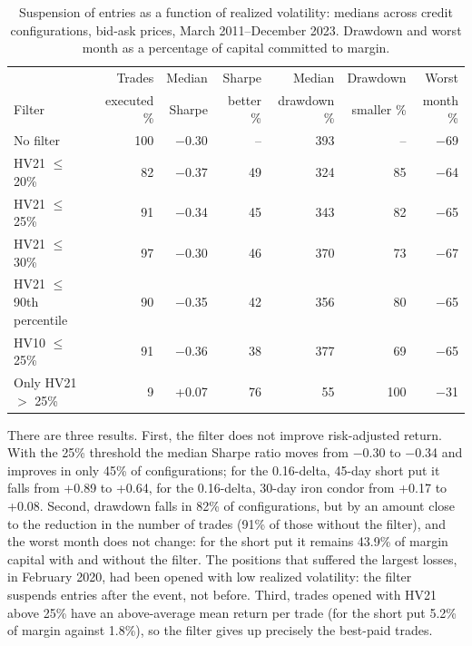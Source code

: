 \documentclass[11pt,a4paper]{article}
\begin{document}
\begin{table}[ht]\centering\small
\caption{Suspension of entries as a function of realized volatility: medians across credit configurations, bid-ask prices, March 2011--December 2023. Drawdown and worst month as a percentage of capital committed to margin.}\label{tab:fvol}
\begin{tabular}{lrrrrrr}\toprule
 & Trades & Median & Sharpe & Median & Drawdown & Worst \\
Filter & executed \% & Sharpe & better \% & drawdown \% & smaller \% & month \% \\ \midrule
No filter & 100 & $-$0.30 & -- & 393 & -- & $-$69 \\
HV21 $\le$ 20\% & 82 & $-$0.37 & 49 & 324 & 85 & $-$64 \\
HV21 $\le$ 25\% & 91 & $-$0.34 & 45 & 343 & 82 & $-$65 \\
HV21 $\le$ 30\% & 97 & $-$0.30 & 46 & 370 & 73 & $-$67 \\
HV21 $\le$ 90th percentile & 90 & $-$0.35 & 42 & 356 & 80 & $-$65 \\
HV10 $\le$ 25\% & 91 & $-$0.36 & 38 & 377 & 69 & $-$65 \\
Only HV21 $>$ 25\% & 9 & +0.07 & 76 & 55 & 100 & $-$31 \\
\bottomrule\end{tabular}\end{table}

There are three results. First, the filter does not improve risk-adjusted return. With the 25\% threshold the median Sharpe ratio moves from $-$0.30 to $-$0.34 and improves in only 45\% of configurations; for the 0.16-delta, 45-day short put it falls from +0.89 to +0.64, for the 0.16-delta, 30-day iron condor from +0.17 to +0.08. Second, drawdown falls in 82\% of configurations, but by an amount close to the reduction in the number of trades (91\% of those without the filter), and the worst month does not change: for the short put it remains 43.9\% of margin capital with and without the filter. The positions that suffered the largest losses, in February 2020, had been opened with low realized volatility: the filter suspends entries after the event, not before. Third, trades opened with HV21 above 25\% have an above-average mean return per trade (for the short put 5.2\% of margin against 1.8\%), so the filter gives up precisely the best-paid trades.
\end{document}
